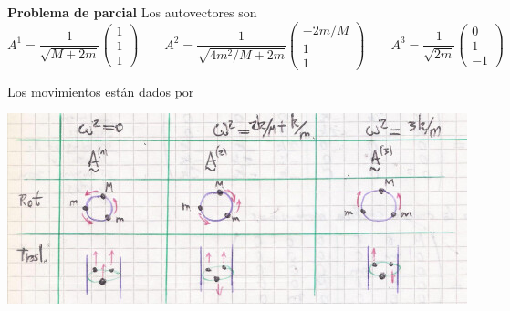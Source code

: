 \documentclass[10pt,oneside]{CBFT_book}
\begin{document}
\begin{ejemplo}{\bf Problema de parcial}
Los autovectores son 
\[
	A^1 = \frac{1}{\sqrt{M + 2m}} \begin{pmatrix} 1 \\ 1 \\ 1 \end{pmatrix} \qquad 
	A^2 = \frac{1}{\sqrt{4m^2/M + 2m}} \begin{pmatrix} -2m/M \\ 1 \\ 1 \end{pmatrix} \qquad 
	A^3 = \frac{1}{\sqrt{ 2m }} \begin{pmatrix} 0 \\ 1 \\ -1 \end{pmatrix} \qquad 
\]
 
Los movimientos están dados por

\includegraphics[scale=0.5]{images/fig_mc_problema_parcial_osc_4.jpg}
 

\end{ejemplo}
\end{document}
